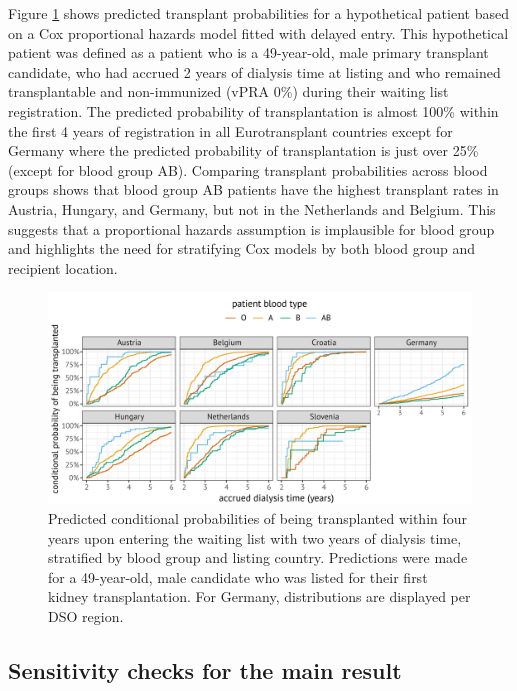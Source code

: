 \documentclass[11pt,twoside,]{book}
\begin{document}
Figure \ref{fig:ch7fig2} shows predicted transplant probabilities for a hypothetical
patient based on a Cox proportional hazards model fitted with delayed entry. This
hypothetical patient was defined as a patient who is a 49-year-old, male primary
transplant candidate, who had accrued 2 years of dialysis time at listing
and who remained transplantable and non-immunized (vPRA 0\%) during their waiting
list registration. The predicted probability of transplantation is almost 100\% within the first 4
years of registration in all Eurotransplant countries except for Germany where the
predicted probability of transplantation is just over 25\% (except for blood
group AB). Comparing transplant probabilities across blood groups shows that
blood group AB patients have the highest transplant rates in Austria, Hungary, and Germany,
but not in the Netherlands and Belgium. This suggests that a proportional
hazards assumption is implausible for blood group and highlights the
need for stratifying Cox models by both blood group and recipient
location.

\begin{figure}[ht]

{\centering \includegraphics[width=1\linewidth]{figures/ch7//figure2} 

}

\caption{Predicted conditional probabilities of being transplanted within four years 
  upon entering the waiting list with two years of dialysis time, stratified by blood group
  and listing country. Predictions were made for a 49-year-old, male candidate who was listed for their first kidney transplantation. For Germany, distributions are displayed per DSO region.}\label{fig:ch7fig2}
\end{figure}

\subsection{Sensitivity checks for the main result}\label{sensitivity-checks-for-the-main-result}
\end{document}
